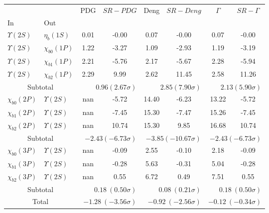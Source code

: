 \begin{tabular}{|l|l|c|c|c|c|c|c|}%
\hline%
&&PDG&$SR-PDG$&Deng&$SR-Deng$&$\Gamma$&$SR-\Gamma$\\%
In&Out&&&&&&\\%
\hline%
$\Upsilon(2S)$&$\eta_{b}(1S)$&0.01&-0.00&0.07&-0.00&0.07&-0.00\\%
$\Upsilon(2S)$&$\chi_{b0}(1P)$&1.22&-3.27&1.09&-2.93&1.19&-3.19\\%
$\Upsilon(2S)$&$\chi_{b1}(1P)$&2.21&-5.76&2.17&-5.67&2.28&-5.94\\%
$\Upsilon(2S)$&$\chi_{b2}(1P)$&2.29&9.99&2.62&11.45&2.58&11.26\\%
\hline%
\hline%
\multicolumn{2}{|c|}{Subtotal}&\multicolumn{2}{|r|}{$0.96 (2.67\sigma)$}&\multicolumn{2}{|r|}{$2.85 (7.90\sigma)$}&\multicolumn{2}{|r|}{$2.13 (5.90\sigma)$}\\%
\hline%
\hline%
$\chi_{b0}(2P)$&$\Upsilon(2S)$&nan&-5.72&14.40&-6.23&13.22&-5.72\\%
$\chi_{b1}(2P)$&$\Upsilon(2S)$&nan&-7.45&15.30&-7.47&15.26&-7.45\\%
$\chi_{b2}(2P)$&$\Upsilon(2S)$&nan&10.74&15.30&9.85&16.68&10.74\\%
\hline%
\hline%
\multicolumn{2}{|c|}{Subtotal}&\multicolumn{2}{|r|}{$-2.43 (-6.73\sigma)$}&\multicolumn{2}{|r|}{$-3.85 (-10.67\sigma)$}&\multicolumn{2}{|r|}{$-2.43 (-6.73\sigma)$}\\%
\hline%
\hline%
$\chi_{b0}(3P)$&$\Upsilon(2S)$&nan&-0.09&2.55&-0.10&2.18&-0.09\\%
$\chi_{b1}(3P)$&$\Upsilon(2S)$&nan&-0.28&5.63&-0.31&5.04&-0.28\\%
$\chi_{b2}(3P)$&$\Upsilon(2S)$&nan&0.55&6.72&0.49&7.51&0.55\\%
\hline%
\hline%
\multicolumn{2}{|c|}{Subtotal}&\multicolumn{2}{|r|}{$0.18~(0.50\sigma)$}&\multicolumn{2}{|r|}{$0.08~(0.21\sigma)$}&\multicolumn{2}{|r|}{$0.18~(0.50\sigma)$}\\%
\hline%
\hline%
\multicolumn{2}{|c|}{Total}&\multicolumn{2}{|r|}{$-1.28~(-3.56\sigma)$}&\multicolumn{2}{|r|}{$-0.92~(-2.56\sigma)$}&\multicolumn{2}{|r|}{$-0.12~(-0.34\sigma)$}\\%
\hline%
\end{tabular}